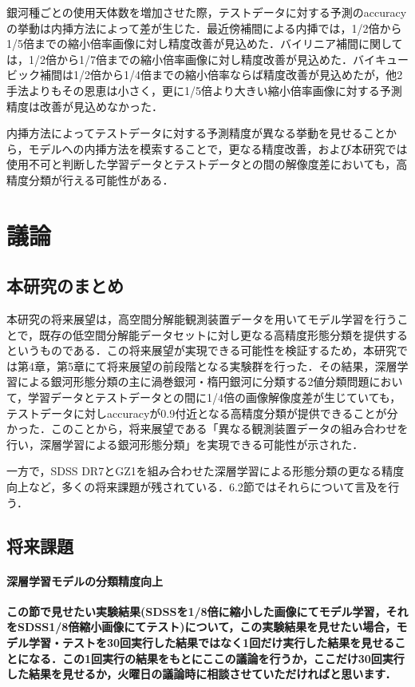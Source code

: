 \documentclass[a4j, 11pt]{jreport}
\begin{document}
銀河種ごとの使用天体数を増加させた際，テストデータに対する予測のaccuracyの挙動は内挿方法によって差が生じた．最近傍補間による内挿では，1/2倍から1/5倍までの縮小倍率画像に対し精度改善が見込めた．バイリニア補間に関しては，1/2倍から1/7倍までの縮小倍率画像に対し精度改善が見込めた．バイキュービック補間は1/2倍から1/4倍までの縮小倍率ならば精度改善が見込めたが，他2手法よりもその恩恵は小さく，更に1/5倍より大きい縮小倍率画像に対する予測精度は改善が見込めなかった．

内挿方法によってテストデータに対する予測精度が異なる挙動を見せることから，モデルへの内挿方法を模索することで，更なる精度改善，および本研究では使用不可と判断した学習データとテストデータとの間の解像度差においても，高精度分類が行える可能性がある．

\newpage
\chapter{議論}
\section{本研究のまとめ}
本研究の将来展望は，高空間分解能観測装置データを用いてモデル学習を行うことで，既存の低空間分解能データセットに対し更なる高精度形態分類を提供するというものである．この将来展望が実現できる可能性を検証するため，本研究では第4章，第5章にて将来展望の前段階となる実験群を行った．その結果，深層学習による銀河形態分類の主に渦巻銀河・楕円銀河に分類する2値分類問題において，学習データとテストデータとの間に1/4倍の画像解像度差が生じていても，テストデータに対しaccuracyが0.9付近となる高精度分類が提供できることが分かった．このことから，将来展望である「異なる観測装置データの組み合わせを行い，深層学習による銀河形態分類」を実現できる可能性が示された．

一方で，SDSS DR7とGZ1を組み合わせた深層学習による形態分類の更なる精度向上など，多くの将来課題が残されている．6.2節ではそれらについて言及を行う．

\section{将来課題}
\subsubsection{深層学習モデルの分類精度向上}
\textbf{この節で見せたい実験結果(SDSSを1/8倍に縮小した画像にてモデル学習，それをSDSS1/8倍縮小画像にてテスト)について，この実験結果を見せたい場合，モデル学習・テストを30回実行した結果ではなく1回だけ実行した結果を見せることになる．この1回実行の結果をもとにここの議論を行うか，ここだけ30回実行した結果を見せるか，火曜日の議論時に相談させていただければと思います．}
\end{document}

